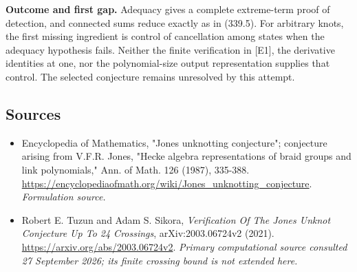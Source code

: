 \documentclass[11pt]{article}
\begin{document}
\textbf{Outcome and first gap.} Adequacy gives a complete extreme-term proof of detection, and connected sums reduce exactly as in (339.5). For arbitrary knots, the first missing ingredient is control of cancellation among states when the adequacy hypothesis fails. Neither the finite verification in [E1], the derivative identities at one, nor the polynomial-size output representation supplies that control. The selected conjecture remains unresolved by this attempt.

\subsection{Sources}
\begin{itemize}
\item[S1]Encyclopedia of Mathematics, "Jones unknotting conjecture"; conjecture arising from V.F.R. Jones, "Hecke algebra representations of braid groups and link polynomials," Ann. of Math. 126 (1987), 335-388.
\url{https://encyclopediaofmath.org/wiki/Jones_unknotting_conjecture}.
\textit{Formulation source.}
\item[E1]Robert E. Tuzun and Adam S. Sikora, \emph{Verification Of The Jones Unknot Conjecture Up To 24 Crossings}, arXiv:2003.06724v2 (2021).
\url{https://arxiv.org/abs/2003.06724v2}.
\textit{Primary computational source consulted 27 September 2026; its finite crossing bound is not extended here.}
\end{itemize}
\end{document}
